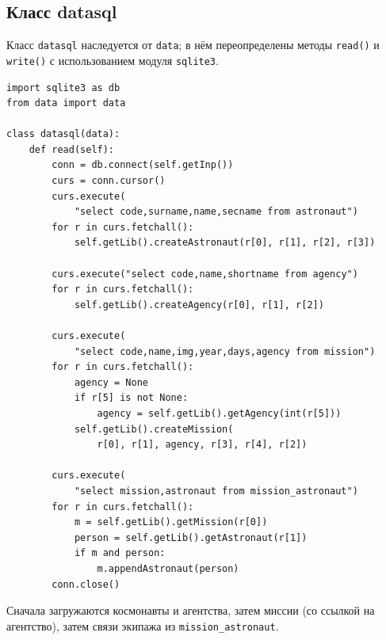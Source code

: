 \documentclass[a4paper,14pt]{extarticle}
\begin{document}
\subsection{Класс datasql}

Класс \texttt{datasql} наследуется от \texttt{data}; в нём переопределены методы \texttt{read()} и \texttt{write()} с использованием модуля \texttt{sqlite3}.

\begin{lstlisting}[caption={Модуль \texttt{datasql.py}: метод \texttt{read()}}]
import sqlite3 as db
from data import data

class datasql(data):
    def read(self):
        conn = db.connect(self.getInp())
        curs = conn.cursor()
        curs.execute(
            "select code,surname,name,secname from astronaut")
        for r in curs.fetchall():
            self.getLib().createAstronaut(r[0], r[1], r[2], r[3])

        curs.execute("select code,name,shortname from agency")
        for r in curs.fetchall():
            self.getLib().createAgency(r[0], r[1], r[2])

        curs.execute(
            "select code,name,img,year,days,agency from mission")
        for r in curs.fetchall():
            agency = None
            if r[5] is not None:
                agency = self.getLib().getAgency(int(r[5]))
            self.getLib().createMission(
                r[0], r[1], agency, r[3], r[4], r[2])

        curs.execute(
            "select mission,astronaut from mission_astronaut")
        for r in curs.fetchall():
            m = self.getLib().getMission(r[0])
            person = self.getLib().getAstronaut(r[1])
            if m and person:
                m.appendAstronaut(person)
        conn.close()
\end{lstlisting}

Сначала загружаются космонавты и агентства, затем миссии (со ссылкой на агентство), затем связи экипажа из \texttt{mission\_astronaut}.
\end{document}
